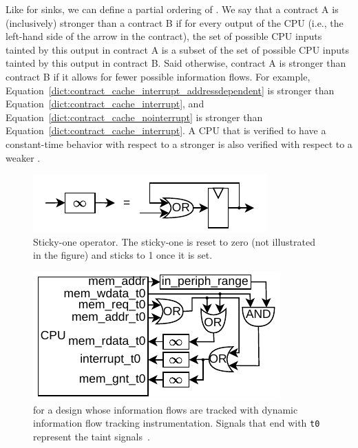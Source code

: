 Like for sinks, we can define a partial ordering of \pics.
We say that a contract A is (inclusively) stronger than a contract B if for every output of the CPU (i.e., the left-hand side of the arrow in the contract), the set of possible CPU inputs tainted by this output in contract A is a subset of the set of possible CPU inputs tainted by this output in contract B.
Said otherwise, contract A is stronger than contract B if it allows for fewer possible information flows.
For example, Equation~\ref{dict:contract_cache_interrupt_addressdependent} is stronger than Equation~\ref{dict:contract_cache_interrupt}, and Equation~\ref{dict:contract_cache_nointerrupt} is stronger than Equation~\ref{dict:contract_cache_interrupt}.
A CPU that is verified to have a constant-time behavior with respect to a stronger \pic is also verified with respect to a weaker \pic.

\begin{figure}
    \begin{center}
    \includegraphics[width=.7\columnwidth]{figures/stickyone/stickyone.pdf}
    \end{center}
    \vspace*{-1em}
    \caption{Sticky-one operator. The sticky-one is reset to zero (not illustrated in the figure) and sticks to 1 once it is set.}
    \label{fig:stickyone}
    \vspace*{-.4em}
\end{figure}


\begin{figure}[t]
    \begin{center}
    \includegraphics[width=.7\columnwidth]{figures/picinstrum_taints/picinstrum_taints.pdf}
    \end{center}
    \vspace*{-1em}
    \caption{\Pici for a design whose information flows are tracked with dynamic information flow tracking instrumentation. Signals that end with \texttt{t0} represent the taint signals~\cite{tiwari2009complete,solt2022cellift}.
    }
    \label{fig:pic_instrum_taints}
    \vspace*{-.4em}
\end{figure}

